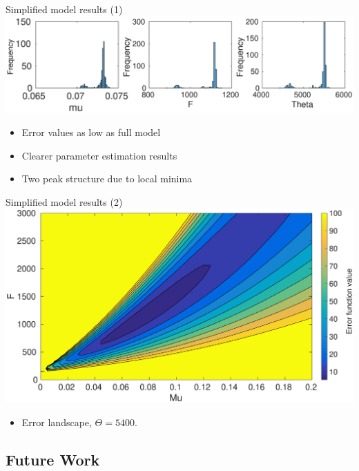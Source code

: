 \documentclass{beamer}
\begin{document}
\begin{frame}{Simplified model results (1)}
  \includegraphics[scale = 0.29, clip = true, trim = 70 0 0 400]{Figures/13_9_hist_simplified}
  \begin{itemize}
\item  Error values as low as full model
\item Clearer parameter estimation results
\item Two peak structure due to local minima
\end{itemize}
\end{frame}

\begin{frame}{Simplified model results (2)}
  \includegraphics[scale = 0.26, clip = true, trim = 40 0 0 0]{Figures/Likelihood_rough_presentation}
    \begin{itemize}
\item  Error landscape, $\Theta = 5400$.
\end{itemize}
\end{frame}

\subsection{Future Work}
\end{document}
